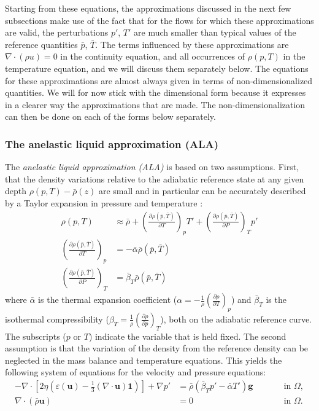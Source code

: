 \documentclass{article}
\begin{document}
Starting from these equations, the approximations discussed in the next few
subsections make use of the fact that for the flows for which these approximations are valid, the
perturbations $p'$, $T'$ are much smaller than typical values of the reference
quantities $\bar p$, $\bar T$. 
The terms influenced by these approximations are $\nabla \cdot (\rho u) =0$ in the 
continuity equation, and all occurrences of $\rho(p,T)$ in the temperature equation, 
and we will discuss them separately below. The equations for these approximations are
almost always given in terms of non-dimensionalized quantities. We will for
now stick with the dimensional form because it expresses in a clearer way the
approximations that are made. The non-dimensionalization can then be done on
each of the forms below separately.

\subsubsection{The anelastic liquid approximation (ALA)}
\label{sec:ala}

The \textit{anelastic liquid approximation (ALA)} is based on two assumptions.
First, that the density variations relative to the adiabatic reference state at
any given depth $\rho(p,T)-\bar\rho (z)$ are small and in particular can be
accurately described by a Taylor expansion in pressure and temperature \cite{STO01}:
\begin{align}
  \rho(p,T) &\approx
  \bar\rho 
  + \left( \frac{\partial \rho(\bar p,\bar T)}{\partial T} \right)_{p} T' 
  + \left( \frac{\partial \rho(\bar p,\bar T)}{\partial P} \right)_{T} p' \\
  \left( \frac{\partial \rho(\bar p,\bar T)}{\partial T} \right)_{p} &= -\bar \alpha \bar \rho(\bar p,\bar T) \\
  \left( \frac{\partial \rho(\bar p,\bar T)}{\partial P} \right)_{T} &= \bar \beta_T \bar \rho(\bar p,\bar T)
\end{align}
where $\bar \alpha$ is the thermal expansion coefficient
($\alpha = -\frac{1}{\rho}\left(\frac{\partial \rho}{\partial T}\right)_p$) and $\bar \beta_T$ is
the isothermal compressibility
($\beta_T = \frac{1}{\rho}\left(\frac{\partial \rho}{\partial p}\right)_T$),
both on the adiabatic reference curve. The
subscripts ($p$ or $T$) indicate the variable that is held fixed.
The second assumption is that the variation of the density from the reference
density can be neglected in the mass balance and temperature equations.
This yields the following system of equations for the velocity and pressure
equations:
\begin{align}
  \label{eq:stokes-ALA-1}
  -\nabla \cdot \left[2\eta \left(\varepsilon(\mathbf u)
                                  - \frac{1}{3}(\nabla \cdot \mathbf u)\mathbf 1\right)
                \right] + \nabla p' &=
  \bar \rho \left(\bar \beta_T p' - \bar \alpha T' \right) \mathbf g
  & \qquad
  & \textrm{in $\Omega$},
  \\
  \label{eq:stokes-ALA-2}
  \nabla \cdot (\bar\rho \mathbf u) &= 0
  & \qquad
  & \textrm{in $\Omega$}.
\end{align}
\end{document}
